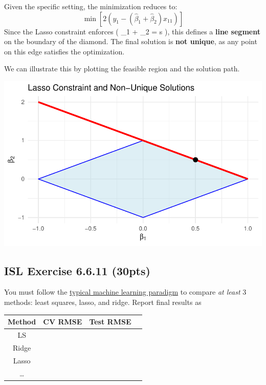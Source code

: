 \documentclass[
  letterpaper,
  DIV=11,
  numbers=noendperiod]{scrartcl}
\begin{document}
Given the specific setting, the minimization reduces to: \[
\min \left[ 2(y_1 - (\hat{\beta}_1 + \hat{\beta}_2) x_{11}) \right]
\] Since the Lasso constraint enforces (
\textbar{}\hat{\beta}\_1\textbar{} + \textbar{}\hat{\beta}\_2\textbar{}
= s ), this defines a \textbf{line segment} on the boundary of the
diamond. The final solution is \textbf{not unique}, as any point on this
edge satisfies the optimization.

We can illustrate this by plotting the feasible region and the solution
path.

\begin{center}
\includegraphics{hw3_files/figure-pdf/unnamed-chunk-13-1.pdf}
\end{center}

\subsection{ISL Exercise 6.6.11
(30pts)}\label{isl-exercise-6.6.11-30pts}

You must follow the
\href{https://ucla-biostat-212a.github.io/2024winter/slides/06-modelselection/workflow_lasso.html}{typical
machine learning paradigm} to compare \emph{at least} 3 methods: least
squares, lasso, and ridge. Report final results as

\begin{longtable}[]{@{}cccc@{}}
\toprule\noalign{}
Method & CV RMSE & Test RMSE & \\
\midrule\noalign{}
\endhead
\bottomrule\noalign{}
\endlastfoot
LS & & & \\
Ridge & & & \\
Lasso & & & \\
\ldots{} & & & \\
\end{longtable}
\end{document}
